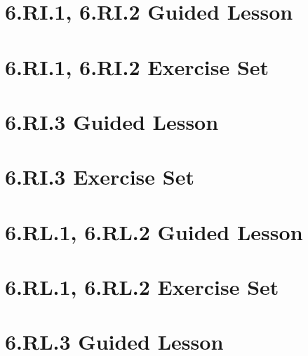 \documentclass[a4paper,12pt]{article}
\title{}
\date{}
\begin{document}
 

\hypertarget{toc}{}  %
\tableofcontents
\newpage

\pagestyle{fancy}  %

\newpage
\section{6.RI.1, 6.RI.2 Guided Lesson}


\newpage
\section{6.RI.1, 6.RI.2 Exercise Set}

\newpage


\newpage
\section{6.RI.3 Guided Lesson}


\newpage
\section{6.RI.3 Exercise Set}


\newpage
\section{6.RL.1, 6.RL.2 Guided Lesson}


\newpage
\section{6.RL.1, 6.RL.2 Exercise Set}

\newpage


\newpage
\section{6.RL.3 Guided Lesson}

\end{document}
